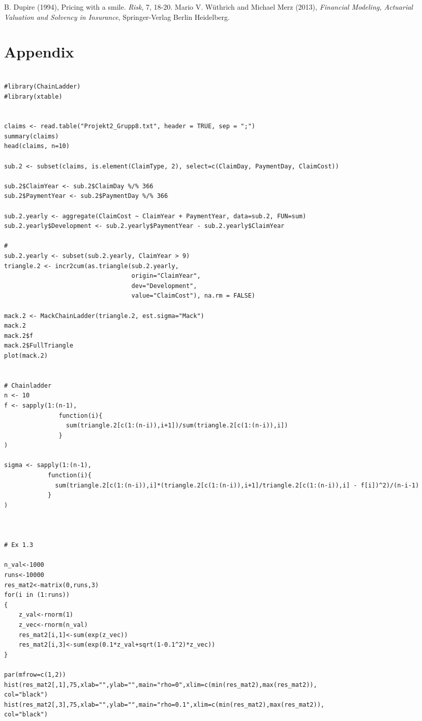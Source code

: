 \documentclass[11pt]{article}
\begin{document}
\begin{thebibliography}{99}
B. Dupire (1994),
Pricing with a smile.
\emph{Risk}, 7, 18-20.
  Mario V. W\"{u}thrich and Michael Merz (2013),
  \emph{Financial Modeling, Actuarial Valuation and Solvency in Insurance},
  Springer-Verlag Berlin Heidelberg.
\end{thebibliography}


\section*{Appendix}

\begin{verbatim}

#library(ChainLadder)
#library(xtable)


claims <- read.table("Projekt2_Grupp8.txt", header = TRUE, sep = ";")
summary(claims)
head(claims, n=10)

sub.2 <- subset(claims, is.element(ClaimType, 2), select=c(ClaimDay, PaymentDay, ClaimCost))

sub.2$ClaimYear <- sub.2$ClaimDay %/% 366
sub.2$PaymentYear <- sub.2$PaymentDay %/% 366

sub.2.yearly <- aggregate(ClaimCost ~ ClaimYear + PaymentYear, data=sub.2, FUN=sum)
sub.2.yearly$Development <- sub.2.yearly$PaymentYear - sub.2.yearly$ClaimYear

#
sub.2.yearly <- subset(sub.2.yearly, ClaimYear > 9)
triangle.2 <- incr2cum(as.triangle(sub.2.yearly,
                                   origin="ClaimYear",
                                   dev="Development",
                                   value="ClaimCost"), na.rm = FALSE)

mack.2 <- MackChainLadder(triangle.2, est.sigma="Mack")
mack.2
mack.2$f
mack.2$FullTriangle
plot(mack.2)


# Chainladder
n <- 10
f <- sapply(1:(n-1),
               function(i){
                 sum(triangle.2[c(1:(n-i)),i+1])/sum(triangle.2[c(1:(n-i)),i])
               }
)

sigma <- sapply(1:(n-1),
            function(i){
              sum(triangle.2[c(1:(n-i)),i]*(triangle.2[c(1:(n-i)),i+1]/triangle.2[c(1:(n-i)),i] - f[i])^2)/(n-i-1)
            }
)



# Ex 1.3

n_val<-1000
runs<-10000
res_mat2<-matrix(0,runs,3)
for(i in (1:runs))
{
	z_val<-rnorm(1)
	z_vec<-rnorm(n_val)
	res_mat2[i,1]<-sum(exp(z_vec))
	res_mat2[i,3]<-sum(exp(0.1*z_val+sqrt(1-0.1^2)*z_vec))
}

par(mfrow=c(1,2))
hist(res_mat2[,1],75,xlab="",ylab="",main="rho=0",xlim=c(min(res_mat2),max(res_mat2)),
col="black")
hist(res_mat2[,3],75,xlab="",ylab="",main="rho=0.1",xlim=c(min(res_mat2),max(res_mat2)),
col="black")
\end{verbatim}
\end{document}
